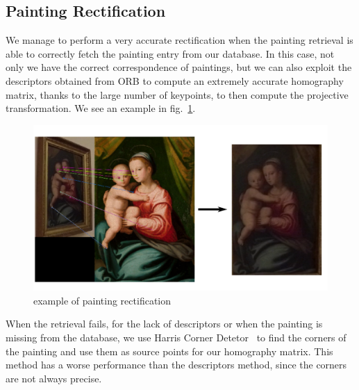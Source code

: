 \subsection{Painting Rectification}
We manage to perform a very accurate rectification when the painting retrieval is able to correctly fetch the painting entry from our database. In this case, not only we have the correct correspondence of paintings, but we can also exploit the descriptors obtained from ORB to compute an extremely accurate homography matrix, thanks to the large number of keypoints, to then compute the projective transformation. We see an example in fig.~\ref{fig:rectification_ex}.

\begin{figure}[h!]
    \centering
    \includegraphics[width=.49\textwidth]{pictures/painting_rectification/rectification.png}
    \caption{example of painting rectification}
    \label{fig:rectification_ex}
\end{figure}

When the retrieval fails, for the lack of descriptors or when the painting is missing from the database, we use Harris Corner Detetor~\cite{harris-corner} to find the corners of the painting and use them as source points for our homography matrix. This method has a worse performance than the descriptors method, since the corners are not always precise.
